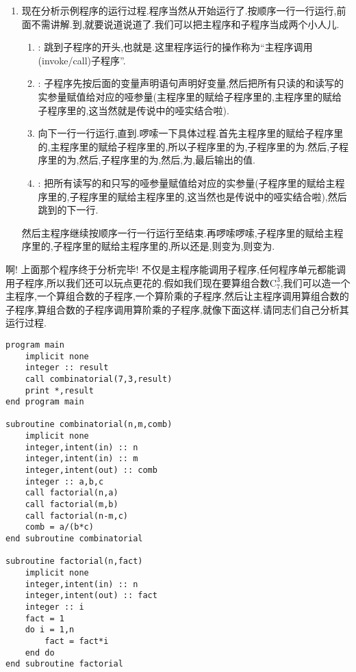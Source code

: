 \begin{enumerate}
    \item 现在分析示例程序的运行过程.程序当然从开始运行了.按顺序一行一行运行,前面不需讲解.到,就要说道说道了.我们可以把主程序和子程序当成两个小人儿.\begin{enumerate}
        \item {}: 跳到子程序的开头,也就是.这里程序运行的操作称为``主程序调用(invoke/call)子程序''.
        \item {}: 子程序先按后面的变量声明语句声明好变量,然后把所有只读的和读写的实参量赋值给对应的哑参量(主程序里的赋给子程序里的,主程序里的赋给子程序里的,这当然就是传说中的哑实结合啦).
        \item 向下一行一行运行,直到.啰嗦一下具体过程.首先主程序里的赋给子程序里的,主程序里的赋给子程序里的,所以子程序里的为,子程序里的为.然后,子程序里的为,然后,子程序里的为,然后,为,最后输出的值.
        \item {}: 把所有读写的和只写的哑参量赋值给对应的实参量(子程序里的赋给主程序里的,子程序里的赋给主程序里的,这当然也是传说中的哑实结合啦),然后跳到的下一行.
    \end{enumerate}然后主程序继续按顺序一行一行运行至结束.再啰嗦啰嗦,子程序里的赋给主程序里的,子程序里的赋给主程序里的,所以还是,则变为,则变为.
\end{enumerate}

啊! 上面那个程序终于分析完毕! 不仅是主程序能调用子程序,任何程序单元都能调用子程序,所以我们还可以玩点更花的.假如我们现在要算组合数$\text{C}_7^3$,我们可以造一个主程序,一个算组合数的子程序,一个算阶乘的子程序,然后让主程序调用算组合数的子程序,算组合数的子程序调用算阶乘的子程序,就像下面这样.请同志们自己分析其运行过程.\label{fact_comb}
\begin{lstlisting}
program main
    implicit none
    integer :: result
    call combinatorial(7,3,result)
    print *,result
end program main

subroutine combinatorial(n,m,comb)
    implicit none
    integer,intent(in) :: n
    integer,intent(in) :: m
    integer,intent(out) :: comb
    integer :: a,b,c
    call factorial(n,a)
    call factorial(m,b)
    call factorial(n-m,c)
    comb = a/(b*c)
end subroutine combinatorial

subroutine factorial(n,fact)
    implicit none
    integer,intent(in) :: n
    integer,intent(out) :: fact
    integer :: i
    fact = 1
    do i = 1,n
        fact = fact*i
    end do
end subroutine factorial
\end{lstlisting}

